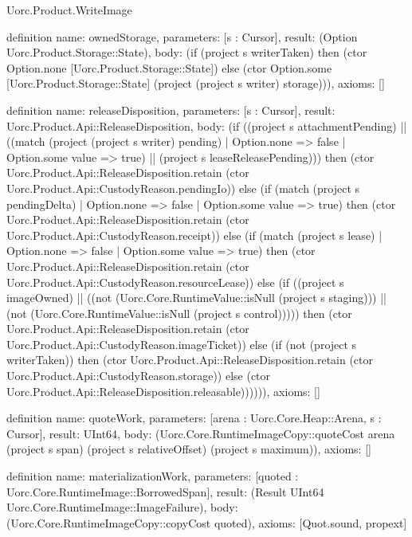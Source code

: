 \begin{lexlean}{Uorc.Product.WriteImage}
\begin{semanticmodule}
definition{
  name: ownedStorage,
  parameters: [s : Cursor],
  result: (Option Uorc.Product.Storage::State),
  body: (if (project s writerTaken) then (ctor Option.none [Uorc.Product.Storage::State]) else (ctor Option.some [Uorc.Product.Storage::State] (project (project s writer) storage))),
  axioms: []
}

definition{
  name: releaseDisposition,
  parameters: [s : Cursor],
  result: Uorc.Product.Api::ReleaseDisposition,
  body: (if ((project s attachmentPending) || ((match (project (project s writer) pending)
    | Option.none => false
    | Option.some value => true) || (project s leaseReleasePending))) then (ctor Uorc.Product.Api::ReleaseDisposition.retain (ctor Uorc.Product.Api::CustodyReason.pendingIo)) else (if (match (project s pendingDelta)
    | Option.none => false
    | Option.some value => true) then (ctor Uorc.Product.Api::ReleaseDisposition.retain (ctor Uorc.Product.Api::CustodyReason.receipt)) else (if (match (project s lease)
    | Option.none => false
    | Option.some value => true) then (ctor Uorc.Product.Api::ReleaseDisposition.retain (ctor Uorc.Product.Api::CustodyReason.resourceLease)) else (if ((project s imageOwned) || ((not (Uorc.Core.RuntimeValue::isNull (project s staging))) || (not (Uorc.Core.RuntimeValue::isNull (project s control))))) then (ctor Uorc.Product.Api::ReleaseDisposition.retain (ctor Uorc.Product.Api::CustodyReason.imageTicket)) else (if (not (project s writerTaken)) then (ctor Uorc.Product.Api::ReleaseDisposition.retain (ctor Uorc.Product.Api::CustodyReason.storage)) else (ctor Uorc.Product.Api::ReleaseDisposition.releasable)))))),
  axioms: []
}

definition{
  name: quoteWork,
  parameters: [arena : Uorc.Core.Heap::Arena, s : Cursor],
  result: UInt64,
  body: (Uorc.Core.RuntimeImageCopy::quoteCost arena (project s span) (project s relativeOffset) (project s maximum)),
  axioms: []
}

definition{
  name: materializationWork,
  parameters: [quoted : Uorc.Core.RuntimeImage::BorrowedSpan],
  result: (Result UInt64 Uorc.Core.RuntimeImage::ImageFailure),
  body: (Uorc.Core.RuntimeImageCopy::copyCost quoted),
  axioms: [Quot.sound, propext]
}


\end{semanticmodule}
\end{lexlean}
